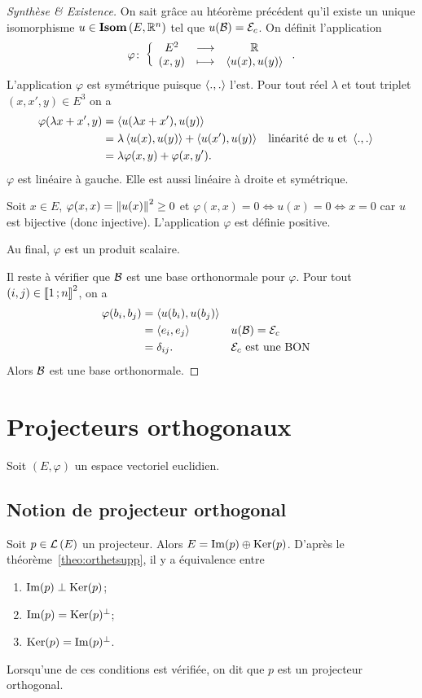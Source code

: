 \begin{proof}[Synthèse \& Existence]
  On sait grâce au htéorème précédent qu'il existe un unique isomorphisme $u \in \mathbf{Isom}\left(E,\mathbb{R}^n\right)$ tel que $u(\mathcal{B})=\mathcal{E}_c$. On définit l'application
  \begin{equation}
    \varphi\colon \left\{\begin{array}{ccc} E^2 & \longrightarrow &\mathbb{R}\\ (x,y) & \longmapsto & \left\langle{u(x)},{u(y)}\right\rangle \end{array} \right..
  \end{equation}
  L'application $\varphi$ est symétrique puisque $\left\langle{.},{.}\right\rangle$ l'est. Pour tout réel $\lambda$ et tout triplet $(x,x',y) \in E^3$ on a
  \begin{align}
    \varphi(\lambda x+x',y) &= \left\langle{u(\lambda x+x')},{u(y)}\right\rangle \\
    &=\lambda \left\langle{u(x)},{u(y)}\right\rangle+ \left\langle{u(x')},{u(y)}\right\rangle && \text{linéarité de } u \text{~et~} \left\langle{.},{.}\right\rangle \\
    &=\lambda \varphi(x,y)+ \varphi(x,y').
  \end{align}
  $\varphi$ est linéaire à gauche. Elle est aussi linéaire à droite et symétrique.

  Soit $x \in E$, $\varphi(x,x)=\left\lVert u(x)\right\rVert^2 \geq 0$ et $\varphi(x,x)=0 \iff u(x)=0 \iff x=0$ car $u$ est bijective (donc injective). L'application $\varphi$ est définie positive.

  Au final, $\varphi$ est un produit scalaire.

  Il reste à vérifier que $\mathcal{B}$ est une base orthonormale pour $\varphi$. Pour tout $(i,j) \in \mathopen{\llbracket}1\mathclose{}\mathpunct{};n\mathclose{\rrbracket}^2$, on a
  \begin{align}
    \varphi(b_i,b_j) &= \left\langle{u(b_i)},{u(b_j)}\right\rangle \\
    &= \left\langle{e_i},{e_j}\right\rangle && u(\mathcal{B})=\mathcal{E}_c\\
    &=\delta_{ij}. && \mathcal{E}_c \text{~est une BON}
  \end{align}
  Alors $\mathcal{B}$ est une base orthonormale.
\end{proof}

\section{Projecteurs orthogonaux}

Soit $(E, \varphi)$ un espace vectoriel euclidien.

\subsection{Notion de projecteur orthogonal}

Soit $p \in \mathcal{L}\left(E\right)$ un projecteur. Alors $E = \operatorname{Im}(p)\oplus \operatorname{Ker}(p)$. D'après le théorème~\ref{theo:orthetsupp}, il y a équivalence entre
\begin{enumerate}
\item $\operatorname{Im}(p) \perp \operatorname{Ker}(p)$;
\item $\operatorname{Im}(p) = \operatorname{Ker}(p)^\perp$;
\item $\operatorname{Ker}(p) = \operatorname{Im}(p)^\perp$.
\end{enumerate}
Lorsqu'une de ces conditions est vérifiée, on dit que $p$ est un projecteur orthogonal.

